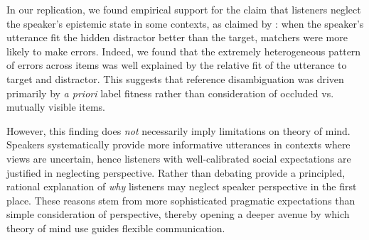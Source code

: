 \documentclass[manuscript]{stjour}
\begin{document}
% 
In our replication, we found empirical support for the claim that listeners neglect the speaker's epistemic state in some contexts, as claimed by \cite{KeysarLinBarr03_LimitsOnTheoryOfMindUse}: when the speaker's utterance fit the hidden distractor better than the target, matchers were more likely to make errors. 
Indeed, we found that the extremely heterogeneous pattern of errors across items was well explained by the relative fit of the utterance to target and distractor.
This suggests that reference disambiguation was driven primarily by \emph{a priori} label fitness rather than consideration of occluded vs. mutually visible items. 

However, this finding does \emph{not} necessarily imply limitations on theory of mind. Speakers systematically provide more informative utterances in contexts where views are uncertain, hence listeners with well-calibrated social expectations are justified in neglecting perspective. Rather than debating provide a principled, rational explanation of \emph{why} listeners may neglect speaker perspective in the first place. These reasons stem from more sophisticated pragmatic expectations than simple consideration of perspective, thereby opening a deeper avenue by which theory of mind use guides flexible communication. %

\end{document}
